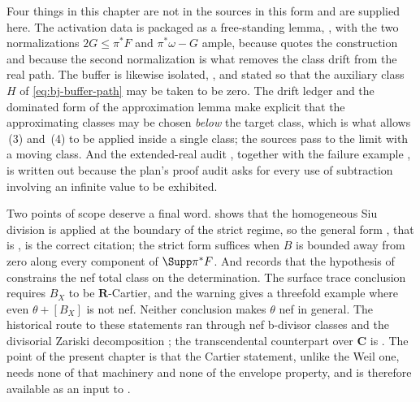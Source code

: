 Four things in this chapter are not in the sources in this form and are
supplied here.  The activation data is packaged as a free-standing lemma,
, with the two normalizations
$2G\leq\pi^*F$ and $\pi^*\omega-G$ ample, because
 quotes the construction and because the second
normalization is what removes the class drift from the real path.  The
buffer is likewise isolated, , and stated so that the
auxiliary class $H$ of \eqref{eq:bj-buffer-path} may be taken to be zero.
The drift ledger  and the dominated form
 of the approximation lemma make
explicit that the approximating classes may be chosen \emph{below} the
target class, which is what allows
\,(3) and~(4) to be applied inside a single
class; the sources pass to the limit with a moving class.  And the
extended-real audit , together with the failure
example , is written out because the
plan's proof audit asks for every use of subtraction involving an infinite
value to be exhibited.

Two points of scope deserve a final word.  
shows that the homogeneous Siu division is applied at the boundary of the
strict regime, so the general form
, that is
\cite[Theorem~6.21]{BJ22}, is the correct citation; the strict form
 suffices when
$B$ is bounded away from zero along every component of
$\Supp\pi^*F$.  And  records that the
hypothesis of  constrains
the nef total class on the determination. The surface trace
conclusion requires $B_X$ to be $\mathbf R$-Cartier, and the
warning gives a threefold example where even $\theta+[B_X]$
is not nef. Neither conclusion makes $\theta$ nef in general.
The historical route to these statements ran through nef b-divisor classes
\cite{BFJ09,DF20} and the divisorial Zariski decomposition
\cite{Bou04,Nak04}; the transcendental counterpart over $\mathbf C$ is
\cite{Xiabdiv,Xiabdiv2}.  The point of the present chapter is that the
Cartier statement, unlike the Weil one, needs none of that machinery and
none of the envelope property, and is therefore available as an input to
.
